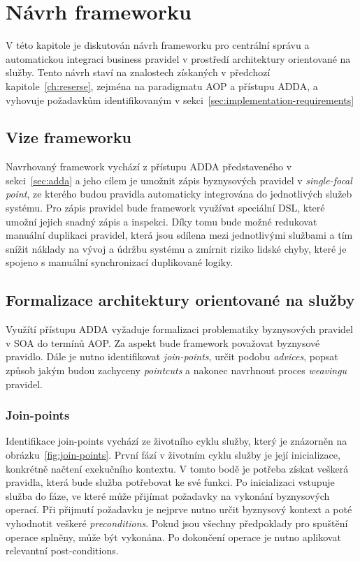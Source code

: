 
\chapter{Návrh frameworku}\label{ch:navrh}

V této kapitole je diskutován návrh frameworku pro centrální správu a automatickou integraci
business pravidel v prostředí architektury orientované na služby. Tento návrh staví na znalostech
získaných v předchozí kapitole~\ref{ch:reserse}, zejména na paradigmatu \gls{AOP} a přístupu \gls{ADDA},
a vyhovuje požadavkům identifikovaným v sekci~\ref{sec:implementation-requirements}

\section{Vize frameworku}

Navrhovaný framework vychází z přístupu \gls{ADDA} představeného v sekci~\ref{sec:adda}
a jeho cílem je umožnit zápis byznysových pravidel v \textit{single-focal point}, ze kterého
budou pravidla automaticky integrována do jednotlivých služeb systému. Pro zápis pravidel
bude framework využívat speciální \gls{DSL}, které umožní jejich snadný zápis a inspekci.
Díky tomu bude možné redukovat manuální duplikaci pravidel, která jsou sdílena mezi jednotlivými
službami a tím snížit náklady na vývoj a údržbu systému a zmírnit riziko lidské chyby,
které je spojeno s manuální synchronizací duplikované logiky.

\section{Formalizace architektury orientované na služby}

Využítí přístupu \gls{ADDA} vyžaduje formalizaci problematiky byznysových pravidel v \gls{SOA}
do termínů \gls{AOP}. Za aspekt bude framework považovat byznysové pravidlo. Dále je nutno
identifikovat \textit{join-points}, určit podobu \textit{advices}, popsat způsob jakým budou
zachyceny \textit{pointcuts} a nakonec navrhnout proces \textit{weavingu} pravidel.

\subsection{Join-points}

Identifikace join-points vychází ze životního cyklu služby, který je znázorněn
na obrázku~\ref{fig:join-points}. První fází v životním cyklu služby je její inicializace,
konkrétně načtení exekučního kontextu. V tomto bodě je potřeba získat veškerá pravidla, která
bude služba potřebovat ke své funkci.
Po inicializaci vstupuje služba do fáze, ve které může přijímat požadavky
na vykonání byznysových operací. Při přijmutí požadavku je nejprve nutno určit
byznysový kontext a poté vyhodnotit veškeré \textit{preconditions}. Pokud jsou všechny předpoklady
pro spuštění operace splněny, může být vykonána. Po dokončení operace je nutno aplikovat relevantní
post-conditions.


